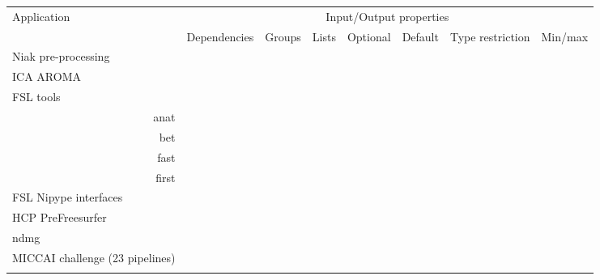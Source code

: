 \documentclass{article}
\begin{document}
\begin{table}
  \begin{tabular}{l|ccccccc}
    \rowcolor[gray]{0.9}
    Application                      & \multicolumn{7}{c}{Input/Output properties} \\
    \rowcolor[gray]{0.9}
                                     & Dependencies      &Groups             & Lists             & Optional          &Default            & Type restriction             & Min/max\\
    
    \hline
    Niak pre-processing              &                   &\cellcolor{gray!75}&\cellcolor{gray!75}&\cellcolor{gray!75}&\cellcolor{gray!75}&\\
    ICA AROMA                        &\cellcolor{gray!75}&\cellcolor{gray!75}&                   &\cellcolor{gray!75}&\cellcolor{gray!75}&\cellcolor{gray!75}&\cellcolor{gray!75}\\
    FSL tools &&&&&&\\
    \multicolumn{1}{r|}{anat}        &\cellcolor{gray!75}&\cellcolor{gray!75}&                   &\cellcolor{gray!75}&\cellcolor{gray!75}&\cellcolor{gray!75}&\cellcolor{gray!75}\\
    \multicolumn{1}{r|}{bet}         &\cellcolor{gray!75}&\cellcolor{gray!75}&\cellcolor{gray!75}&\cellcolor{gray!75}&                   &                   &\cellcolor{gray!75}\\      
    \multicolumn{1}{r|}{fast}        &\cellcolor{gray!75}&                   &                   &\cellcolor{gray!75}&\cellcolor{gray!75}&\cellcolor{gray!75}&\cellcolor{gray!75}\\
    \multicolumn{1}{r|}{first}       &                   &                   &\cellcolor{gray!75}&\cellcolor{gray!75}&\cellcolor{gray!75}&                   &                   \\
    FSL Nipype interfaces     \\
    HCP PreFreesurfer                &                   &                   &                   &                   &                   &                   &                   \\
    ndmg                &                   &       \cellcolor{gray!75}            &                   &          \cellcolor{gray!75}         &      \cellcolor{gray!75}             & \cellcolor{gray!75} &                   \\
    MICCAI challenge (23 pipelines)\\&                   &                   &                   &                   &                   &                   & \\

\end{tabular}
\end{table}
\end{document}
